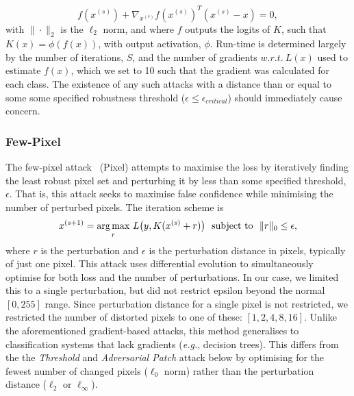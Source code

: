 $$
f(x^{(s)}) + \nabla_{x^{(s)}} f(x^{(s)})^T(x^{(s)} - x) = 0,
$$
with $\|\cdot\|_2$ is the $\ell_2$ norm, and where $f$ outputs the logits of $K$, such that $K(x) = \phi(f(x))$, with output activation, $\phi$.
Run-time is determined largely by the number of iterations, $S$, and the number of gradients $w.r.t.~L(x)$ used to estimate $f(x)$, which we set to 10 such that the gradient was calculated for each class.
The existence of any such attacks with a distance than or equal to some some specified robustness threshold ($\epsilon \leq \epsilon_{critical}$) should immediately cause concern.

\subsubsection{Few-Pixel}

The few-pixel attack~\cite{pixelattack} (Pixel) attempts to maximise the loss by iteratively finding the least robust pixel set and perturbing it by less than some specified threshold, $\epsilon$.
That is, this attack seeks to maximise false confidence while minimising the number of perturbed pixels.
The iteration scheme is
$$
    x^{(s+1)} = \operatorname*{arg\,max}_r \, L\big(y, K(x^{(s)} + r)\big) \text{~~subject~to~~}  \|r\|_0 \leq \epsilon,
$$
where $r$ is the perturbation and $\epsilon$ is the perturbation distance in pixels, typically of just one pixel.
This attack uses differential evolution to simultaneously optimise for both loss and the number of perturbations.
In our case, we limited this to a single perturbation, but did not restrict epsilon beyond the normal $[0, 255]$ range.
Since perturbation distance for a single pixel is not restricted, we restricted the number of distorted pixels to one of these: $[1,2,4,8, 16]$.
Unlike the aforementioned gradient-based attacks, this method generalises to classification systems that lack gradients (\textit{e.g.}, decision trees).
This differs from the the \textit{Threshold} and \textit{Adversarial Patch} attack below by optimising for the fewest number of changed pixels ($\ell_0$ norm) rather than the perturbation distance ($\ell_2$ or $\ell_{\infty}$).

